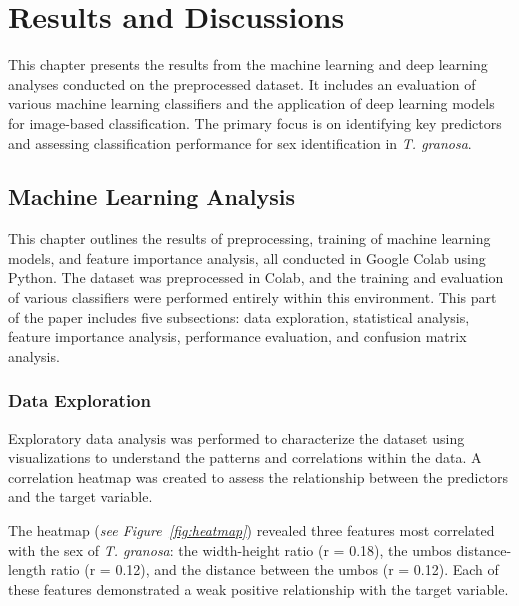 
\chapter{Results and Discussions}
This chapter presents the results from the machine learning and deep learning analyses conducted on the preprocessed dataset. It includes an evaluation of various machine learning classifiers and the application of deep learning models for image-based classification. The primary focus is on identifying key predictors and assessing classification performance for sex identification in \textit{T. granosa}.

\section{Machine Learning Analysis}

This chapter outlines the results of preprocessing, training of machine learning models, and feature importance analysis, all conducted in Google Colab using Python. The dataset was preprocessed in Colab, and the training and evaluation of various classifiers were performed entirely within this environment.  This part of the paper includes five subsections: data exploration, statistical analysis, feature importance analysis, performance evaluation, and confusion matrix analysis.

\subsection{Data Exploration}

Exploratory data analysis was performed to characterize the dataset using visualizations to understand the patterns and correlations within the data. A correlation heatmap was created to assess the relationship between the predictors and the target variable.

The heatmap (\textit{see Figure~\ref{fig:heatmap}}) revealed three features most correlated with the sex of \textit{T. granosa}: the width-height ratio (r = 0.18), the umbos distance-length ratio (r = 0.12), and the distance between the umbos (r = 0.12). Each of these features demonstrated a weak positive relationship with the target variable. 

